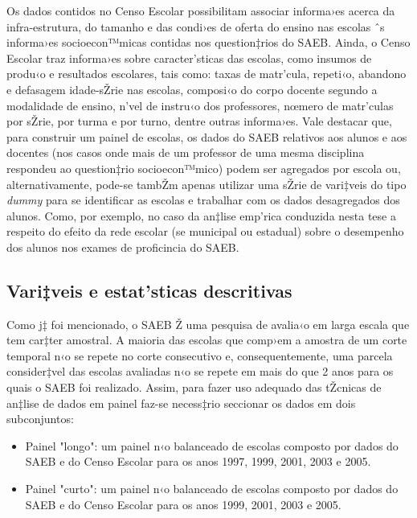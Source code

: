 \documentclass[a4paper, 12pt]{article}
\begin{document}
Os dados contidos no Censo Escolar possibilitam associar informa›es acerca da infra-estrutura, do tamanho e das condi›es de oferta do ensino nas escolas ˆs informa›es socioecon™micas contidas nos question‡rios do SAEB. Ainda, o Censo Escolar traz informa›es sobre caracter’sticas das escolas, como insumos de produ‹o e resultados escolares,  tais como: taxas de matr’cula, repeti‹o, abandono e defasagem idade-sŽrie nas escolas, composi‹o do corpo docente segundo a modalidade de ensino, n’vel de instru‹o dos professores, nœmero de matr’culas por sŽrie, por turma e por turno, dentre outras informa›es. Vale destacar que, para construir um painel de escolas, os dados do SAEB relativos aos alunos e aos docentes (nos casos onde mais de um professor de uma mesma disciplina respondeu ao question‡rio socioecon™mico) podem ser agregados por escola ou, alternativamente, pode-se tambŽm apenas utilizar uma sŽrie de vari‡veis do tipo \emph{dummy} para se identificar as escolas e trabalhar com os dados desagregados dos alunos. Como, por exemplo, no caso da an‡lise emp’rica conduzida nesta tese a respeito do efeito da rede escolar (se municipal ou estadual) sobre o desempenho dos alunos nos exames de proficincia do SAEB.


\subsection{Vari‡veis e estat’sticas descritivas}

Como j‡ foi mencionado, o SAEB Ž uma pesquisa de avalia‹o em larga escala que tem car‡ter amostral. A maioria das escolas que comp›em a amostra de um corte temporal n‹o se repete no corte consecutivo e, consequentemente, uma parcela consider‡vel das escolas avaliadas n‹o se repete em mais do que 2 anos para os quais o SAEB foi realizado. Assim, para fazer uso adequado das tŽcnicas de an‡lise de dados em painel faz-se necess‡rio seccionar os dados em dois subconjuntos: 

\begin{itemize}

\item Painel "longo": um painel n‹o balanceado de escolas composto por dados do SAEB e do Censo Escolar para os anos 1997, 1999, 2001, 2003 e 2005.

\item Painel "curto": um painel n‹o balanceado de escolas composto por dados do SAEB e do Censo Escolar para os anos 1999, 2001, 2003 e 2005.

\end{itemize}
\end{document}

